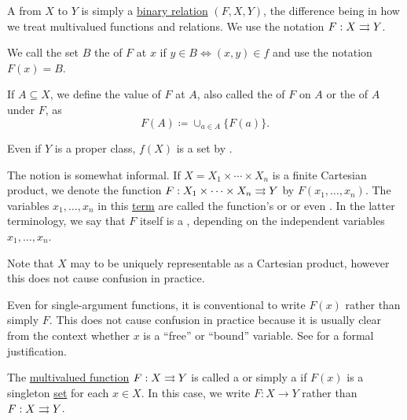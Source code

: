 \begin{definition}\label{def:function}
  A  from \( X \) to \( Y \) is simply a \hyperref[def:binary_relation]{binary relation} \( (F, X, Y) \), the difference being in how we treat multivalued functions and relations. We use the notation \( F: X \rightrightarrows Y \).

  \begin{DefEnum}[series=def:function]
     We call the set \( B \) the  of \( F \) at \( x \) if \( y \in B \iff (x, y) \in f \) and use the notation \( F(x) = B \).

     If \( A \subseteq X \), we define the value of \( F \) at \( A \), also called the  of \( F \) on \( A \) or the  of \( A \) under \( F \), as
    \begin{equation*}
      F(A) \coloneqq \cup_{a \in A} \{ F(a) \}.
    \end{equation*}

    Even if \( Y \) is a proper class, \( f(X) \) is a set by .

     The notion  is somewhat informal. If \( X = X_1 \times \cdots \times X_n \) is a finite Cartesian product, we denote the function \( F: X_1 \times \cdots \times X_n \rightrightarrows Y \) by \( F(x_1, \ldots, x_n) \). The variables \( x_1, \ldots, x_n \) in this \hyperref[def:first_order_term]{term} are called the function's  or  or even . In the latter terminology, we say that \( F \) itself is a , depending on the independent variables \( x_1, \ldots, x_n \).

    Note that \( X \) may to be uniquely representable as a Cartesian product, however this does not cause confusion in practice.

    Even for single-argument functions, it is conventional to write \( F(x) \) rather than simply \( F \). This does not cause confusion in practice because it is usually clear from the context whether \( x \) is a \enquote{free} or \enquote{bound} variable. See  for a formal justification.

     The \hyperref[def:function/multivalued]{multivalued function} \( F: X \rightrightarrows Y \) is called a  or simply a  if \( F(x) \) is a singleton \hyperref[remark:singleton_sets]{set} for each \( x \in X \). In this case, we write \( F: X \to Y \) rather than \( F: X \rightrightarrows Y \).


\end{DefEnum}
\end{definition}

